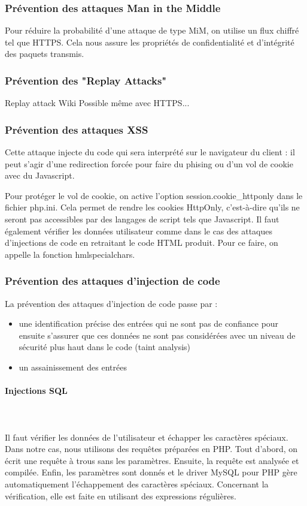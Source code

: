 \documentclass[a4paper]{article}
\begin{document}
\subsubsection{Prévention des attaques Man in the Middle}
Pour réduire la probabilité d'une attaque de type MiM, on utilise un flux
chiffré tel que HTTPS. Cela nous assure les propriétés de confidentialité
et d'intégrité des paquets transmis.

\subsubsection{Prévention des "Replay Attacks"}

		Replay attack Wiki
		Possible même avec HTTPS...
 		
\subsubsection{Prévention des attaques XSS}
 		
Cette attaque injecte du code qui sera interprété sur le navigateur
du client : il peut s'agir d'une redirection forcée pour faire  du phising
ou d'un vol de cookie avec du Javascript.

Pour protéger le vol de cookie, on active l'option session.cookie\_httponly
dans le fichier php.ini. Cela permet de rendre les cookies HttpOnly,
c'est-à-dire qu'ils ne seront pas accessibles par des langages de script
tels que Javascript. Il faut également vérifier les données utilisateur
comme dans le cas des attaques d'injections de code en retraitant le code
HTML produit. Pour ce faire, on appelle la fonction hmlspecialchars.
 		
\subsubsection{Prévention des attaques d'injection de code}
La prévention des attaques d'injection de code passe par :
\begin{itemize}
	\item une identification précise des entrées qui ne sont pas de
		confiance pour ensuite s'assurer que ces données ne sont pas
		considérées avec un niveau de sécurité plus haut dans le code
		(taint analysis) 
	\item un assainissement des entrées
\end{itemize}
		
\paragraph{Injections SQL}
~~\\
\\
Il faut vérifier les données de l'utilisateur et échapper les caractères spéciaux.
Dans notre cas, nous utilisons des requêtes préparées en PHP.
Tout d'abord, on écrit une requête à trous sans les paramètres. Ensuite, la
requête est analysée et compilée. Enfin, les paramètres sont donnés et le driver
MySQL pour PHP gère automatiquement l'échappement des caractères spéciaux.
Concernant la vérification, elle est faite en utilisant des expressions régulières.			
		
\end{document}
